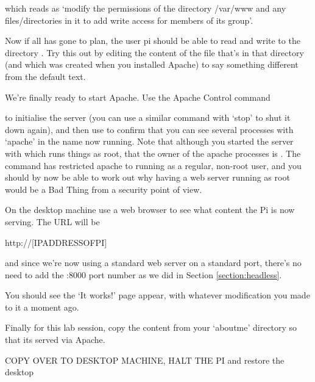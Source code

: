 which reads as `modify the permissions of the directory /var/www and any files/directories in it to add write access for members of its group'. 

Now if all has gone to plan, the user pi should be able to read and write to the directory . Try this out by editing the content of the  file that's in that directory (and which was created when you installed Apache) to say something different from the default text.

We're finally ready to start Apache. Use the Apache Control command


to initialise the server (you can use a similar command with `stop' to shut it down again), and then use  to confirm that you can see several processes with `apache' in the name now running. Note that although you started the server with  which runs things as root, that the owner of the apache processes is . The  command has restricted apache to running as a regular, non-root user, and you should by now be able to work out why having a web server running as root would be a Bad Thing from a security point of view.

On the desktop machine use a web browser to see what content the Pi is now serving. The URL will be 

\begin{ttoutenv}
http://[IPADDRESSOFPI]
\end{ttoutenv}

and since we're now using a standard web server on a standard port, there's no need to add the :8000 port number as we did in Section \ref{section:headless}. 

You should see the `It works!' page appear, with whatever modification you made to it a moment ago.

Finally for this lab session, copy the content from your `aboutme' directory so that its served via Apache.  

\begin{note}
COPY OVER TO DESKTOP MACHINE, HALT THE PI and restore the desktop
\end{note}

